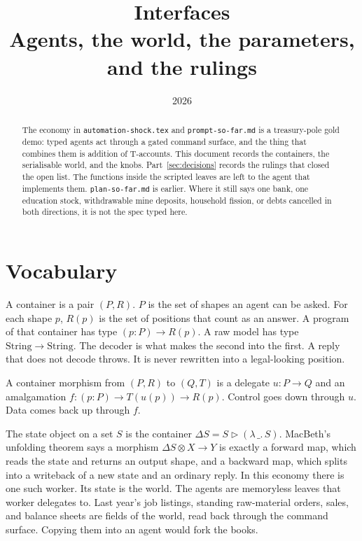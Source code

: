 \documentclass[11pt]{article}
\title{\textbf{Interfaces}\\
\large Agents, the world, the parameters, and the rulings}
\author{}
\date{2026}
\begin{document}
\maketitle

\begin{abstract}
\noindent
The economy in \texttt{automation-shock.tex} and \texttt{prompt-so-far.md}
is a treasury-pole gold demo: typed agents act through a gated command
surface, and the thing that combines them is addition of T-accounts.
This document records the containers, the serialisable world, and the knobs.
Part~\ref{sec:decisions} records the rulings that closed the open list.
The functions inside the scripted leaves are left to the agent that
implements them.
\texttt{plan-so-far.md} is earlier. Where it still says one bank, one
education stock, withdrawable mine deposits, household fission, or debts
cancelled in both directions, it is not the spec typed here.
\end{abstract}

\tableofcontents

\section*{Vocabulary}

A container is a pair $(P, R)$. $P$ is the set of shapes an agent can be
asked. For each shape $p$, $R(p)$ is the set of positions that count as an
answer. A program of that container has type $(p : P) \to R(p)$. A raw model
has type $\mathrm{String} \to \mathrm{String}$. The decoder is what makes the
second into the first. A reply that does not decode throws. It is never
rewritten into a legal-looking position.

A container morphism from $(P, R)$ to $(Q, T)$ is a delegate
$u : P \to Q$ and an amalgamation
$f : (p : P) \to T(u(p)) \to R(p)$. Control goes down through $u$. Data comes
back up through $f$.

The state object on a set $S$ is the container $\Delta S = S \triangleright (\lambda\,\_.\, S)$.
MacBeth's unfolding theorem says a morphism $\Delta S \otimes X \to Y$ is
exactly a forward map, which reads the state and returns an output shape, and
a backward map, which splits into a writeback of a new state and an ordinary
reply. In this economy there is one such worker. Its state is the world.
The agents are memoryless leaves that worker delegates to. Last year's job
listings, standing raw-material orders, sales, and balance sheets are fields
of the world, read back through the command surface. Copying them into an
agent would fork the books.
\end{document}
